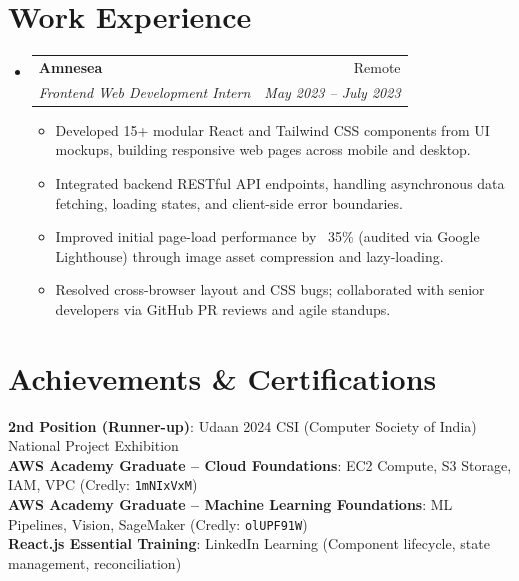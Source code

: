 \documentclass[letterpaper,11pt]{article}
\makeatletter
\newcommand{\resumeItem}[1]{
  \item\small{
    {#1 \vspace{-2pt}}
  }
}
\newcommand{\resumeSubheading}[4]{
  \vspace{-2pt}\item
    \begin{tabular*}{0.97\textwidth}[t]{l@{\extracolsep{\fill}}r}
      \textbf{#1} & #2 \\
      \textit{\small#3} & \textit{\small #4} \\
    \end{tabular*}\vspace{-7pt}
}
\newcommand{\resumeSubHeadingListStart}{\begin{itemize}[leftmargin=0.15in, label={}]}
\newcommand{\resumeSubHeadingListEnd}{\end{itemize}}
\newcommand{\resumeItemListStart}{\begin{itemize}}
\newcommand{\resumeItemListEnd}{\end{itemize}\vspace{-5pt}}
\makeatother
\begin{document}
\section{Work Experience}
  \resumeSubHeadingListStart
    \resumeSubheading
      {Amnesea}{Remote}
      {Frontend Web Development Intern}{May 2023 -- July 2023}
      \resumeItemListStart
        \resumeItem{Developed 15+ modular React and Tailwind CSS components from UI mockups, building responsive web pages across mobile and desktop.}
        \resumeItem{Integrated backend RESTful API endpoints, handling asynchronous data fetching, loading states, and client-side error boundaries.}
        \resumeItem{Improved initial page-load performance by ~35\% (audited via Google Lighthouse) through image asset compression and lazy-loading.}
        \resumeItem{Resolved cross-browser layout and CSS bugs; collaborated with senior developers via GitHub PR reviews and agile standups.}
      \resumeItemListEnd
  \resumeSubHeadingListEnd

\section{Achievements \& Certifications}
 \begin{itemize}[leftmargin=0.15in, label={}]
    \small{\item{
     \textbf{2nd Position (Runner-up)}{: Udaan 2024 CSI (Computer Society of India) National Project Exhibition} \\
     \textbf{AWS Academy Graduate -- Cloud Foundations}{: EC2 Compute, S3 Storage, IAM, VPC (Credly: \texttt{1mNIxVxM})} \\
     \textbf{AWS Academy Graduate -- Machine Learning Foundations}{: ML Pipelines, Vision, SageMaker (Credly: \texttt{olUPF91W})} \\
     \textbf{React.js Essential Training}{: LinkedIn Learning (Component lifecycle, state management, reconciliation)}
    }}
 \end{itemize}
\end{document}
